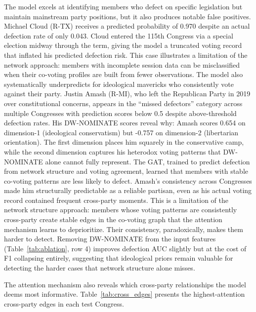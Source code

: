 \documentclass[12pt, a4paper]{article}
\begin{document}
The model excels at identifying members who defect on specific legislation but maintain mainstream party positions, but it also produces notable false positives. Michael Cloud (R-TX) receives a predicted probability of 0.970 despite an actual defection rate of only 0.043. Cloud entered the 115th Congress via a special election midway through the term, giving the model a truncated voting record that inflated his predicted defection risk. This case illustrates a limitation of the network approach: members with incomplete session data can be misclassified when their co-voting profiles are built from fewer observations. The model also systematically underpredicts for ideological mavericks who consistently vote against their party. Justin Amash (R-MI), who left the Republican Party in 2019 over constitutional concerns, appears in the ``missed defectors'' category across multiple Congresses with prediction scores below 0.5 despite above-threshold defection rates. His DW-NOMINATE scores reveal why: Amash scores 0.654 on dimension-1 (ideological conservatism) but -0.757 on dimension-2 (libertarian orientation). The first dimension places him squarely in the conservative camp, while the second dimension captures his heterodox voting patterns that DW-NOMINATE alone cannot fully represent. The GAT, trained to predict defection from network structure and voting agreement, learned that members with stable co-voting patterns are less likely to defect. Amash's consistency across Congresses made him structurally predictable as a reliable partisan, even as his actual voting record contained frequent cross-party moments. This is a limitation of the network structure approach: members whose voting patterns are consistently cross-party create stable edges in the co-voting graph that the attention mechanism learns to deprioritize. Their consistency, paradoxically, makes them harder to detect. Removing DW-NOMINATE from the input features (Table~\ref{tab:ablation}, row 4) improves defection AUC slightly but at the cost of F1 collapsing entirely, suggesting that ideological priors remain valuable for detecting the harder cases that network structure alone misses.

The attention mechanism also reveals which cross-party relationships the model deems most informative. Table~\ref{tab:cross_edges} presents the highest-attention cross-party edges in each test Congress.
\end{document}
